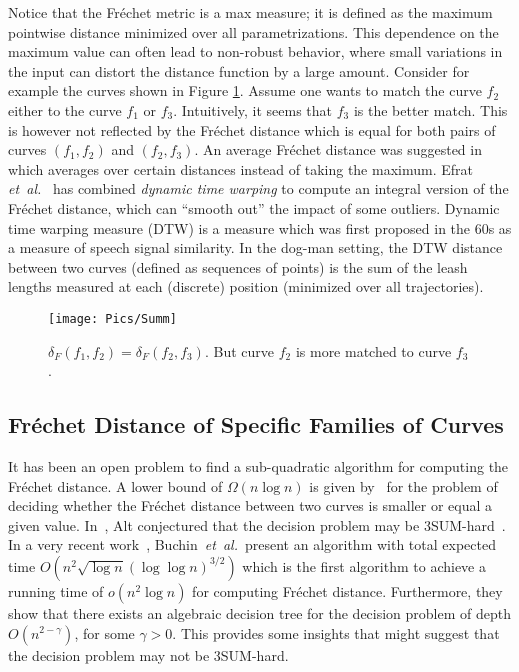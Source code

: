 \documentclass[12pt]{dalthesis}
\newcommand{\etal}{{\em et~al.\/}}
\newcommand{\Frechet}{Fr\'echet }
\newcommand{\distF}{\delta_F}
\begin{document}
  
Notice that the \Frechet metric is a max measure; 
it is defined as the maximum pointwise distance minimized over all parametrizations. 
This dependence on the maximum value can often lead to non-robust behavior, where small variations in
the input can distort the distance function by a large
amount. 
Consider for example the curves shown in Figure \ref{fig:FD-sum}. 
Assume one wants to match
the curve $f_2$ either to the curve $f_1$ or $f_3$. 
Intuitively, it seems that $f_3$ is the better
match. 
This is however not reflected by the \Frechet distance which is equal for 
both pairs of curves $(f_1, f_2)$ and $(f_2, f_3)$.
An average \Frechet distance 
was suggested in~\cite{VehicleTracking} which averages over certain 
distances instead of taking the maximum.
Efrat \etal~\cite{SumFD}  has combined {\em dynamic time warping} to compute an integral  version of the \Frechet distance, 
which can “smooth out” the impact of some outliers.
Dynamic time warping measure (DTW) is a measure which was
first proposed in the 60s as a measure of speech signal similarity.  
In the dog-man setting,
the DTW distance between two curves (defined as sequences
of points) is the sum of the leash lengths measured
at each (discrete) position (minimized over all
trajectories). 











\begin{figure}[t]
	\centering
	\texttt{[image: Pics/Summ]}
	\caption{ $\distF(f_1,f_2) = \distF(f_2,f_3)$. But curve $f_2$ is more matched to curve $f_3$.	}
	\label{fig:FD-sum}
\end{figure}








\subsection{\Frechet Distance of Specific Families of Curves}

It has been an open problem to find a sub-quadratic algorithm 
for computing the \Frechet distance.
A lower bound of $\Omega(n \log n)$ is given by~\cite{LowerBound-FD}
for the problem of deciding whether the \Frechet 
distance between two curves is smaller 
or equal a given value. 
In~\cite{AltBook2009}, Alt conjectured that 
the decision problem may be 3SUM-hard~\cite{ClassOfN2}. 
In a very recent work~\cite{BuchinFasterFrechet},
Buchin~\etal~present an algorithm 
with total expected time
$O(n^2\sqrt{\log n}(\log \log n )^ {3/2})$
which is the first algorithm to achieve 
a running time of $o(n^2\log n)$ for computing \Frechet distance.
Furthermore, they 
show that there exists an algebraic decision tree 
for the decision problem of depth $O(n^{2-\gamma})$, 
for some $\gamma>0$. This 
provides some insights that might suggest
that the decision problem may not be 3SUM-hard.
\end{document}
